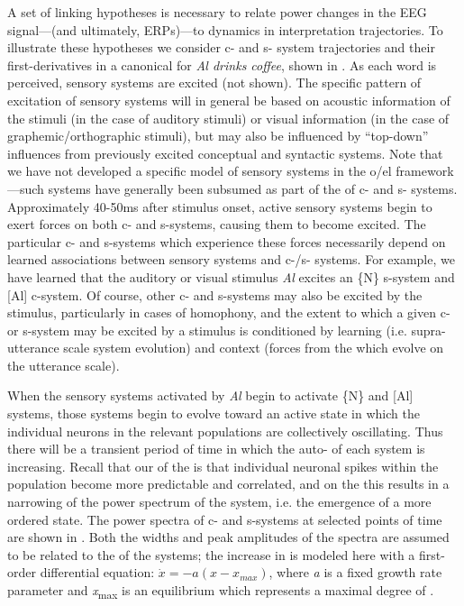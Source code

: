 A set of linking hypotheses is necessary to relate power changes in the EEG signal—(and ultimately, ERPs)—to  dynamics in interpretation trajectories. To illustrate these hypotheses we consider c- and s- system  trajectories and their first-derivatives in a canonical  for \textit{Al drinks coffee}, shown in {}. As each word is perceived, sensory systems are excited (not shown). The specific pattern of excitation of sensory systems will in general be based on acoustic information of the stimuli (in the case of auditory stimuli) or visual information (in the case of graphemic/orthographic stimuli), but may also be influenced by “top-down” influences from previously excited conceptual and syntactic systems. Note that we have not developed a specific model of sensory systems in the o/el framework—such systems have generally been subsumed as part of the  of c- and s- systems. Approximately 40-50ms after stimulus onset, active sensory systems begin to exert forces on both c- and s-systems, causing them to become excited. The particular c- and s-systems which experience these forces necessarily depend on learned associations between sensory systems and c-/s- systems. For example, we have learned that the auditory or visual stimulus \textit{Al} excites an \{N\} s-system and [Al] c-system. Of course, other c- and s-systems may also be excited by the stimulus, particularly in cases of homophony, and the extent to which a given c- or s-system may be excited by a stimulus is conditioned by learning (i.e. supra-utterance scale system evolution) and context (forces from the  which evolve on the utterance scale).

  When the sensory systems activated by \textit{Al} begin to activate \{N\} and [Al] systems, those systems begin to evolve toward an active state in which the individual neurons in the relevant populations are collectively oscillating. Thus there will be a transient period of time in which the auto- of each system is increasing. Recall that our  of the  is that individual neuronal spikes within the population become more predictable and correlated, and on the  this results in a narrowing of the power spectrum of the system, i.e. the emergence of a more ordered state. The power spectra of c- and s-systems at selected points of time are shown in {}. Both the widths and peak amplitudes of the spectra are assumed to be related to the  of the systems; the increase in  is modeled here with a first-order differential equation:  $\dot{{x}}=-a\left(x-{x}_{\mathit{max}}\right)$, where \textit{a} is a fixed growth rate parameter and \textit{x}\textsubscript{max} is an equilibrium which represents a maximal degree of . 

